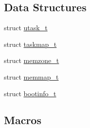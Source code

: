 \subsection*{Data Structures}
\begin{DoxyCompactItemize}
\item 
struct \mbox{\hyperlink{structutask__t}{utask\+\_\+t}}
\item 
struct \mbox{\hyperlink{structtaskmap__t}{taskmap\+\_\+t}}
\item 
struct \mbox{\hyperlink{structmemzone__t}{memzone\+\_\+t}}
\item 
struct \mbox{\hyperlink{structmemmap__t}{memmap\+\_\+t}}
\item 
struct \mbox{\hyperlink{structbootinfo__t}{bootinfo\+\_\+t}}
\end{DoxyCompactItemize}
\subsection*{Macros}
